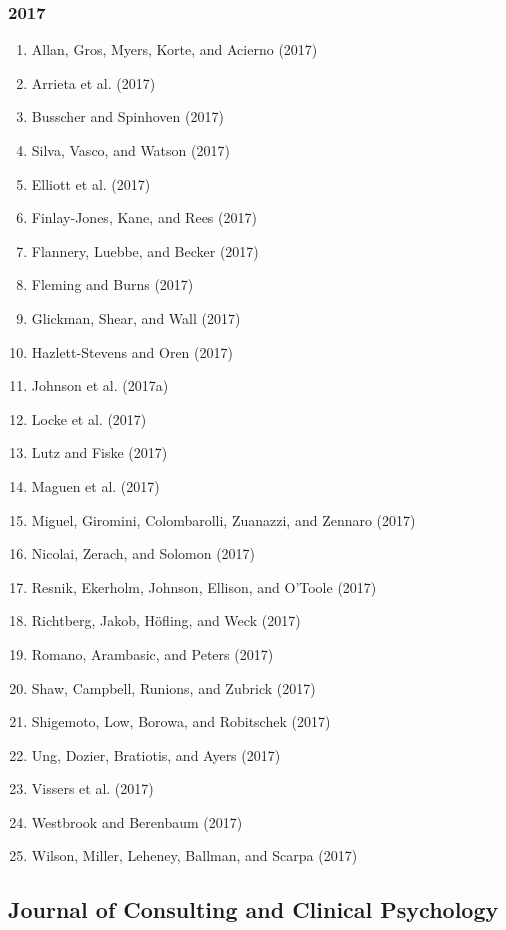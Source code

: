 \documentclass[english,man]{apa6}
\providecommand{\tightlist}{%
  \setlength{\itemsep}{0pt}\setlength{\parskip}{0pt}}
\theoremstyle{definition}
\theoremstyle{definition}
\theoremstyle{definition}
\theoremstyle{remark}
\begin{document}
\subsubsection{2017}\label{section-1}

\begin{enumerate}
\def\labelenumi{\arabic{enumi})}
\tightlist
\item
  Allan, Gros, Myers, Korte, and Acierno (2017)
\item
  Arrieta et al. (2017)
\item
  Busscher and Spinhoven (2017)
\item
  Silva, Vasco, and Watson (2017)
\item
  Elliott et al. (2017)
\item
  Finlay-Jones, Kane, and Rees (2017)
\item
  Flannery, Luebbe, and Becker (2017)
\item
  Fleming and Burns (2017)
\item
  Glickman, Shear, and Wall (2017)
\item
  Hazlett-Stevens and Oren (2017)
\item
  Johnson et al. (2017a)
\item
  Locke et al. (2017)
\item
  Lutz and Fiske (2017)
\item
  Maguen et al. (2017)
\item
  Miguel, Giromini, Colombarolli, Zuanazzi, and Zennaro (2017)
\item
  Nicolai, Zerach, and Solomon (2017)
\item
  Resnik, Ekerholm, Johnson, Ellison, and O'Toole (2017)
\item
  Richtberg, Jakob, Höfling, and Weck (2017)
\item
  Romano, Arambasic, and Peters (2017)
\item
  Shaw, Campbell, Runions, and Zubrick (2017)
\item
  Shigemoto, Low, Borowa, and Robitschek (2017)
\item
  Ung, Dozier, Bratiotis, and Ayers (2017)
\item
  Vissers et al. (2017)
\item
  Westbrook and Berenbaum (2017)
\item
  Wilson, Miller, Leheney, Ballman, and Scarpa (2017)
\end{enumerate}

\subsection{Journal of Consulting and Clinical
Psychology}\label{journal-of-consulting-and-clinical-psychology}
\end{document}
